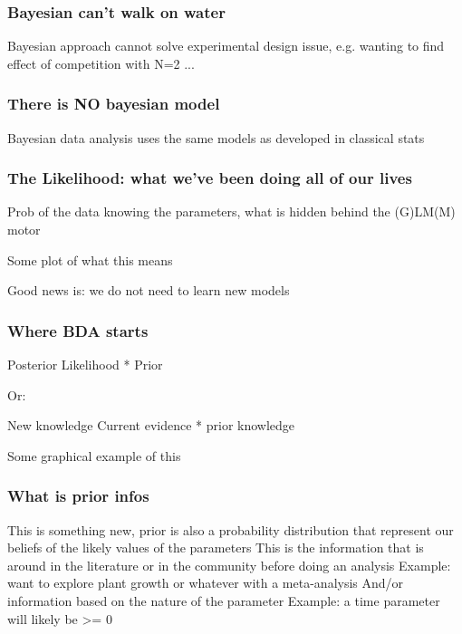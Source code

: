 \documentclass{beamer}
\begin{document}
 \begin{frame}
  \frametitle{\bf Bayesian can't walk on water}
  
  Bayesian approach cannot solve experimental design issue, e.g. wanting to find effect of competition with N=2 ...
  
 \end{frame}
 
 \begin{frame}
  \frametitle{\bf There is NO bayesian model}
  
  Bayesian data analysis uses the same models as developed in classical stats
  
 \end{frame}
 
 \begin{frame}
  \frametitle{\bf The Likelihood: what we've been doing all of our lives}
  
  Prob of the data knowing the parameters, what is hidden behind the (G)LM(M) motor
  
  Some plot of what this means  
  
  Good news is: we do not need to learn new models
  
 \end{frame}
 
 \begin{frame}
  \frametitle{\bf Where BDA starts}
  
  Posterior \propto Likelihood * Prior
  
  Or:
  
  New knowledge \propto Current evidence * prior knowledge
  
  Some graphical example of this
  
 \end{frame}

   \begin{frame}
  \frametitle{\bf What is prior infos}
  
  This is something new, prior is also a probability distribution that represent our beliefs of the likely values of the parameters
  This is the information that is around in the literature or in the community before doing an analysis
  Example: want to explore plant growth or whatever with a meta-analysis
  And/or information based on the nature of the parameter
  Example: a time parameter will likely be >= 0
  
 \end{frame}
 
\end{document}
